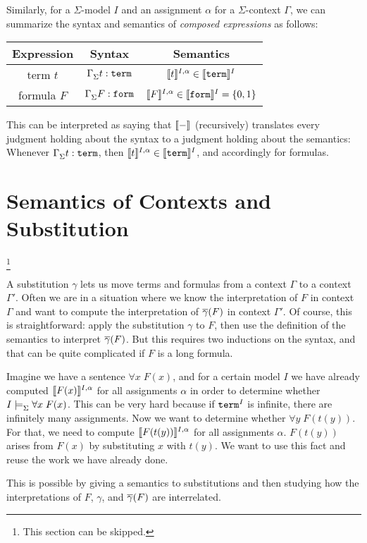 Similarly, for a $\Sigma$-model $I$ and an assignment $\alpha$ for a $\Sigma$-context $\Gamma$, we can summarize the syntax and semantics of \emph{composed expressions} as follows:
\begin{center}
\begin{tabular}{|c|c|c|}
\hline
Expression          & Syntax          & Semantics \\ \hline
term $t$            & $\Gamma^{}_{\Sigma}t:\mathtt{term}$  & $\llbracket t\rrbracket^{I,\alpha}\in \llbracket \mathtt{term}\rrbracket^{I}$ \\
formula $F$         & $\Gamma^{}_{\Sigma}F:\mathtt{form}$  & $\llbracket F\rrbracket^{I,\alpha}\in \llbracket \mathtt{form}\rrbracket^{I}=\{0,1\}$ \\
\hline
\end{tabular}
\end{center}
This can be interpreted as saying that $\llbracket -\rrbracket^{}$ (recursively) translates every judgment holding about the syntax to a judgment holding about the semantics: Whenever $\Gamma^{}_{\Sigma}t:\mathtt{term}$, then $\llbracket t\rrbracket^{I,\alpha}\in \llbracket \mathtt{term}\rrbracket^{I}$, and accordingly for formulas.


\section{Semantics of Contexts and Substitution}\footnote{This section can be skipped.}

A substitution $\gamma$ lets us move terms and formulas from a context $\Gamma$ to a context $\Gamma'$. Often we are in a situation where we know the interpretation of $F$ in context $\Gamma$ and want to compute the interpretation of $\overline{\gamma}(F)$ in context $\Gamma'$. Of course, this is straightforward: apply the substitution $\gamma$ to $F$, then use the definition of the semantics to interpret $\overline{\gamma}(F)$. But this requires two inductions on the syntax, and that can be quite complicated if $F$ is a long formula.

Imagine we have a sentence $\forall x\;F(x)$, and for a certain model $I$ we have already computed $\llbracket F(x)\rrbracket^{I,\alpha}$ for all assignments $\alpha$ in order to determine whether $I\models^{}_{\Sigma}\forall x\;F(x)$. This can be very hard because if $\mathtt{term}^I$ is infinite, there are infinitely many assignments. Now we want to determine whether $\forall y\;F(t(y))$. For that, we need to compute $\llbracket F(t(y))\rrbracket^{I,\alpha}$ for all assignments $\alpha$. $F(t(y))$ arises from $F(x)$ by substituting $x$ with $t(y)$. We want to use this fact and reuse the work we have already done.

This is possible by giving a semantics to substitutions and then studying how the interpretations of $F$, $\gamma$, and $\overline{\gamma}(F)$ are interrelated.
\medskip

